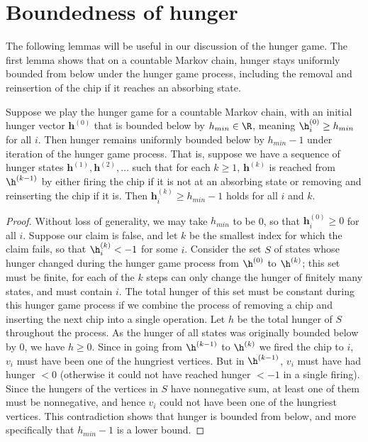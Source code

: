 \section{Boundedness of hunger}\label{section: boundedness hunger}
The following lemmas will be useful in our discussion of the hunger game.
The first lemma shows that on a countable Markov chain, 
hunger stays uniformly bounded from below under the hunger game process,
including the removal and reinsertion of the chip 
if it reaches an absorbing state.

\begin{lemma}\label{lemma: hunger bounded lower}
Suppose we play the hunger game for a countable Markov chain, 
with an initial hunger vector $\mathbf{h}^{(0)}$ that is bounded below by $h_{min}\in\R$,
meaning $\h_i^{(0)} \geq h_{min}$ for all $i$.
Then hunger remains uniformly bounded below by $h_{min}-1$
under iteration of the hunger game process.
That is, suppose we have a sequence of hunger states 
$\mathbf{h}^{(1)}, \mathbf{h}^{(2)},\dots$ such that 
for each $k \geq 1$, $\mathbf{h}^{(k)}$ is reached 
from $\h^{(k-1)}$ by either firing the chip if it is not at an absorbing state
or removing and reinserting the chip if it is.
Then $\mathbf{h}^{(k)}_i \geq h_{min}-1$ holds for all $i$ and $k$.
\end{lemma}
\begin{proof}
Without loss of generality, we may take $h_{min}$ to be 0,
so that $\mathbf{h}_i^{(0)} \geq 0$ for all $i$.
Suppose our claim is false,
and let $k$ be the smallest index for which the claim fails,
so that $\h^{(k)}_i < -1$ for some $i$.
Consider the set $S$ of states whose hunger changed 
during the hunger game process from $\h^{(0)}$ to $\h^{(k)}$; 
this set must be finite, for each of the $k$ steps can only
change the hunger of finitely many states, and must contain $i$.
The total hunger of this set must be constant during this hunger game process
if we combine the process of removing a chip and inserting the next chip
into a single operation.
Let $h$ be the total hunger of $S$ throughout the process.
As the hunger of all states was originally bounded below by $0$,
we have $h \geq 0$.
Since in going from $\h^{(k-1)}$ to $\h^{(k)}$ we fired the chip to $i$,
$v_i$ must have been one of the hungriest vertices.
But in $\h^{(k-1)}$, $v_i$ must have had hunger $< 0$
(otherwise it could not have reached hunger $< -1$ in a single firing).
Since the hungers of the vertices in $S$ have nonnegative sum,
at least one of them must be nonnegative,
and hence $v_i$ could not have been one of the hungriest vertices.
This contradiction shows that hunger is bounded from below,
and more specifically that $h_{min}-1$ is a lower bound.
\end{proof}


